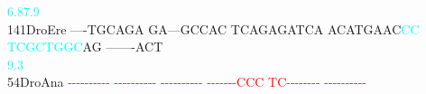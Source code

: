 \documentclass[11pt,twoside,reqno,a4paper]{article}
\begin{document}
{\hspace*{4\charwidth}\hspace*{7\charwidth}\hspace*{1\charwidth}\hspace*{1\charwidth}\hspace*{1\charwidth}\hspace*{34\charwidth}\textcolor{cyan}{6.8}\hspace*{1\charwidth}\hspace*{11\charwidth}\textcolor{cyan}{7.9}\hspace*{1\charwidth}\hspace*{1\charwidth}\\
141\hspace*{1\charwidth}DroEre	----TGCAGA	GA---GCCAC	TCAGAGATCA	ACATGAAC\textcolor{cyan}{C}\textcolor{cyan}{C}	\textcolor{cyan}{T}\textcolor{cyan}{C}\textcolor{cyan}{G}\textcolor{cyan}{C}\textcolor{cyan}{T}\textcolor{cyan}{G}\textcolor{cyan}{G}\textcolor{cyan}{C}AG	-------ACT	\\
\hspace*{4\charwidth}\hspace*{7\charwidth}\hspace*{1\charwidth}\hspace*{1\charwidth}\hspace*{1\charwidth}\hspace*{38\charwidth}\textcolor{cyan}{9.3}\hspace*{1\charwidth}\hspace*{1\charwidth}\hspace*{1\charwidth}\\
54\hspace*{2\charwidth}DroAna	\textcolor{red}{-}\textcolor{red}{-}\textcolor{red}{-}\textcolor{red}{-}\textcolor{red}{-}\textcolor{red}{-}\textcolor{red}{-}\textcolor{red}{-}\textcolor{red}{-}\textcolor{red}{-}	\textcolor{red}{-}\textcolor{red}{-}\textcolor{red}{-}\textcolor{red}{-}\textcolor{red}{-}\textcolor{red}{-}\textcolor{red}{-}\textcolor{red}{-}\textcolor{red}{-}\textcolor{red}{-}	\textcolor{red}{-}\textcolor{red}{-}\textcolor{red}{-}\textcolor{red}{-}\textcolor{red}{-}\textcolor{red}{-}\textcolor{red}{-}\textcolor{red}{-}\textcolor{red}{-}\textcolor{red}{-}	\textcolor{red}{-}\textcolor{red}{-}\textcolor{red}{-}\textcolor{red}{-}\textcolor{red}{-}\textcolor{red}{-}\textcolor{red}{-}\textcolor{red}{C}\textcolor{red}{C}\textcolor{red}{C}	\textcolor{red}{T}\textcolor{red}{C}\textcolor{red}{-}\textcolor{red}{-}\textcolor{red}{-}\textcolor{red}{-}\textcolor{red}{-}\textcolor{red}{-}\textcolor{red}{-}\textcolor{red}{-}	\textcolor{red}{-}\textcolor{red}{-}\textcolor{red}{-}\textcolor{red}{-}\textcolor{red}{-}\textcolor{red}{-}\textcolor{red}{-}\textcolor{red}{-}\textcolor{red}{-}\textcolor{red}{-}	\\
}
\end{document}
